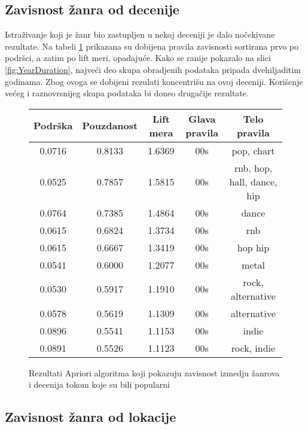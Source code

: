 \subsection{Zavisnost \v{z}anra od decenije}
\label{subsec:AprioriZavisnostZanraOdDecenije}

Istra\v{z}ivanje koji je \v{z}anr bio zastupljen u nekoj deceniji je dalo no\v{c}ekivane rezultate. Na tabeli \ref{fig:aprioriDecade} prikazana su dobijena pravila zavisnosti sortirana prvo po podr\v{s}ci, a zatim po lift meri, opadaju\'c{}e.
Kako se ranije pokazalo na slici \ref{fig:YearDuration}, najve\'c{}i deo skupa obradjenih podataka pripada dvehiljaditim godinama. Zbog ovoga se dobijeni rezulati koncentri\v{s}u na ovoj deceniji. Kori\v{s}enje ve\'c{}eg i raznovrsnijeg skupa podataka bi doneo druga\v{c}ije rezultate.

\begin{figure}[H]
    \footnotesize
    \centering
    \begin{tabular}{|c|c|c|c|c|}
        \hline
        Podr\v{s}ka & Pouzdanost & Lift mera & Glava pravila & Telo pravila \\
        \hline
        0.0716 & 0.8133 & 1.6369 & 00s & pop, chart \\
        0.0525 & 0.7857 & 1.5815 & 00s & rnb, hop, hall, dance, hip \\
        0.0764 & 0.7385 & 1.4864 & 00s & dance \\
        0.0615 & 0.6824 & 1.3734 & 00s & rnb \\
        0.0615 & 0.6667 & 1.3419 & 00s & hop hip \\
        0.0541 & 0.6000 & 1.2077 & 00s & metal \\
        0.0530 & 0.5917 & 1.1910 & 00s & rock, alternative \\
        0.0578 & 0.5619 & 1.1309 & 00s & alternative \\
        0.0896 & 0.5541 & 1.1153 & 00s & indie \\
        0.0891 & 0.5526 & 1.1123 & 00s & rock, indie \\
        \hline
    \end{tabular}
    \caption{Rezultati Apriori algoritma koji pokazuju zavisnost izmedju \v{z}anrova i decenija tokom koje su bili popularni}
    \label{fig:aprioriDecade}
\end{figure}


\subsection{Zavisnost \v{z}anra od lokacije}
\label{subsec:AprioriZavisnostZanraOdLokacije}

